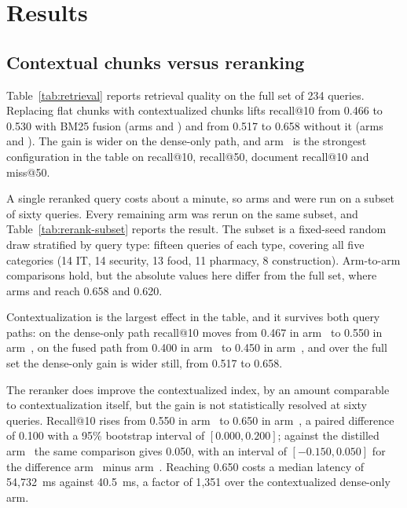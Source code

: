 \section{Results}
\label{sec:results}

\subsection{Contextual chunks versus reranking}
\label{sec:results-main}

Table~\ref{tab:retrieval} reports retrieval quality on the full set of 234
queries. Replacing flat chunks with contextualized chunks lifts recall@10 from
0.466 to 0.530 with BM25 fusion (arms  and ) and from 0.517 to
0.658 without it (arms  and ). The gain is wider on the dense-only
path, and arm~ is the strongest configuration in the table on recall@10,
recall@50, document recall@10 and miss@50.



A single reranked query costs about a minute, so arms  and  were
run on a subset of sixty queries. Every remaining arm was rerun on the same
subset, and Table~\ref{tab:rerank-subset} reports the result. The subset is a
fixed-seed random draw stratified by query type: fifteen queries of each type,
covering all five categories (14 IT, 14 security, 13 food, 11 pharmacy, 8
construction). Arm-to-arm comparisons hold, but the absolute values here differ
from the full set, where arms  and  reach 0.658 and 0.620.

Contextualization is the largest effect in the table, and it survives both
query paths: on the dense-only path recall@10 moves from 0.467 in arm~ to
0.550 in arm~, on the fused path from 0.400 in arm~ to 0.450 in
arm~, and over the full set the dense-only gain is wider still, from
0.517 to 0.658.

The reranker does improve the contextualized index, by an amount comparable to
contextualization itself, but the gain is not statistically resolved at sixty
queries. Recall@10 rises from 0.550 in arm~ to 0.650 in arm~, a
paired difference of 0.100 with a 95\% bootstrap interval of $[0.000, 0.200]$;
against the distilled arm~ the same comparison gives 0.050, with an
interval of $[-0.150, 0.050]$ for the difference arm~ minus arm~.
Reaching 0.650 costs a median latency of 54{,}732~ms against 40.5~ms, a factor
of 1{,}351 over the contextualized dense-only arm.

